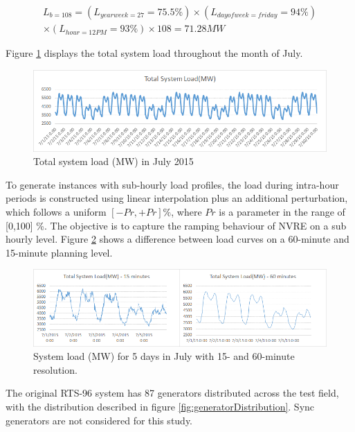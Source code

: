 \documentclass[12pt,LUDisStyle,twosided]{book}
\begin{document}
\begin{multline}
L_{b = 108} =  (L_{yearweek = 27} = 75.5\%) \times (L_{dayofweek = friday} = 94\%) 
\\ \times (L_{hour= 12 PM} = 93\%) \times 108 = 71.28MW
\end{multline}

Figure \ref{fig:totalSystemLoadJuly} displays the total system load throughout the month of July.

\begin{figure}[H] 
  \includegraphics[width=\textwidth,height=\textheight,keepaspectratio]{totalSystemLoadJuly.png}
  \caption{Total system load (MW) in July 2015}
  \label{fig:totalSystemLoadJuly}
\end{figure}

To generate instances with sub-hourly load profiles, the load during intra-hour periods is constructed using linear interpolation plus an additional perturbation, which follows a uniform $[-Pr,+Pr]\%$, where $Pr$ is a parameter in the range of [0,100] \%. The objective is to capture the ramping behaviour of NVRE on a sub hourly level. Figure \ref{fig:perturbationDifference} shows a difference between load curves on a 60-minute and 15-minute planning level. 

\begin{figure}[H] 
  \includegraphics[width=\textwidth,height=\textheight,keepaspectratio]{perturbationDifference.png}
  \caption{System load (MW) for 5 days in July with 15- and 60-minute resolution.}
  \label{fig:perturbationDifference}
\end{figure}

The original RTS-96 system has 87 generators distributed across the test field, with the distribution described in figure \ref{fig:generatorDistribution}. Sync generators are not considered for this study.
\end{document}
